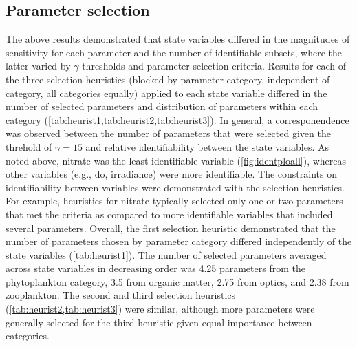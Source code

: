 \documentclass[letterpaper,12pt,oneside]{article}\usepackage[]{graphicx}\usepackage[]{color}
\begin{document}
\subsection{Parameter selection}



The above results demonstrated that state variables differed in the magnitudes of sensitivity for each parameter and the number of identifiable subsets, where the latter varied by $\gamma$ thresholds and parameter selection criteria. Results for each of the three selection heuristics (blocked by parameter category, independent of category, all categories equally) applied to each state variable differed in the number of selected parameters and distribution of parameters within each category (\cref{tab:heurist1,tab:heurist2,tab:heurist3}).  In general, a corresponendence was observed between the number of parameters that were selected given the threhold of $\gamma = 15$ and relative identifiability between the state variables.  As noted above, nitrate was the least identifiable variable (\cref{fig:identploall}), whereas other variables (e.g., \ac{do}, irradiance) were more identifiable.  The constraints on identifiability between variables were demonstrated with the selection heuristics.  For example, heuristics for nitrate typically selected only one or two parameters that met the criteria as compared to more identifiable variables that included several parameters. Overall, the first selection heuristic demonstrated that the number of parameters chosen by parameter category differed independently of the state variables (\cref{tab:heurist1}). The number of selected parameters averaged across state variables in decreasing order was 4.25 parameters from the phytoplankton category, 3.5 from organic matter, 2.75 from optics, and 2.38 from zooplankton. The second and third selection heuristics (\cref{tab:heurist2,tab:heurist3}) were similar, although more parameters were generally selected for the third heuristic given equal importance between categories.
\end{document}
